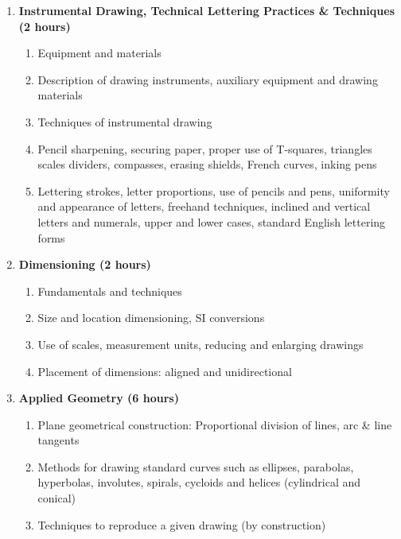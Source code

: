 \begin{enumerate}
    \item \textbf{Instrumental Drawing, Technical Lettering Practices \& Techniques \hfill (2 hours) }
    \begin{enumerate}
        \item Equipment and materials
        \item Description of drawing instruments, auxiliary equipment and drawing materials
        \item Techniques of instrumental drawing 
        \item Pencil sharpening, securing paper, proper use of T-squares, triangles scales dividers, compasses, erasing shields, French curves, inking pens
        \item Lettering strokes, letter proportions, use of pencils and pens, uniformity and appearance of letters, freehand techniques, inclined and vertical letters and numerals, upper and lower cases, standard English lettering forms
    \end{enumerate}
    
    \item \textbf{Dimensioning \hfill (2 hours)}
    \begin{enumerate}
        \item Fundamentals and techniques
        \item Size and location dimensioning, SI conversions
        \item Use of scales, measurement units, reducing and enlarging drawings
        \item Placement of dimensions: aligned and unidirectional
    \end{enumerate}
    
    \item \textbf{Applied Geometry \hfill (6 hours)}
    \begin{enumerate}
        \item Plane geometrical construction: Proportional division of lines, arc \& line tangents
        \item Methods for drawing standard curves such as ellipses, parabolas, hyperbolas, involutes, spirals, cycloids and helices (cylindrical and conical)
        \item Techniques to reproduce a given drawing (by construction)
    \end{enumerate}
    

\end{enumerate}
